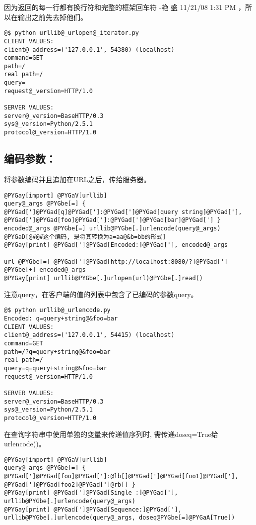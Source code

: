 \documentclass[a4paper,10pt,english]{manual}
\begin{document}
因为返回的每一行都有换行符和完整的框架回车符 -艳 盛 11/21/08 1:31 PM ，所以在输出之前先去掉他们。

\begin{Verbatim}[commandchars=@\[\]]
@$ python urllib@_urlopen@_iterator.py
CLIENT VALUES:
client@_address=('127.0.0.1', 54380) (localhost)
command=GET
path=/
real path=/
query=
request@_version=HTTP/1.0

SERVER VALUES:
server@_version=BaseHTTP/0.3
sys@_version=Python/2.5.1
protocol@_version=HTTP/1.0
\end{Verbatim}


\subsection{编码参数：}

将参数编码并且追加在URL之后，传给服务器。

\begin{Verbatim}[commandchars=@\[\]]
@PYGay[import] @PYGaV[urllib]
query@_args @PYGbe[=] { @PYGad[']@PYGad[q]@PYGad[']:@PYGad[']@PYGad[query string]@PYGad['], @PYGad[']@PYGad[foo]@PYGad[']:@PYGad[']@PYGad[bar]@PYGad['] }
encoded@_args @PYGbe[=] urllib@PYGbe[.]urlencode(query@_args) @PYGaD[@#@#这个编码, 是将其转换为a=aa@&b=bb的形式]
@PYGay[print] @PYGad[']@PYGad[Encoded:]@PYGad['], encoded@_args

url @PYGbe[=] @PYGad[']@PYGad[http://localhost:8080/?]@PYGad['] @PYGbe[+] encoded@_args
@PYGay[print] urllib@PYGbe[.]urlopen(url)@PYGbe[.]read()
\end{Verbatim}

注意query，在客户端的值的列表中包含了已编码的参数query。

\begin{Verbatim}[commandchars=@\[\]]
@$ python urllib@_urlencode.py
Encoded: q=query+string@&foo=bar
CLIENT VALUES:
client@_address=('127.0.0.1', 54415) (localhost)
command=GET
path=/?q=query+string@&foo=bar
real path=/
query=q=query+string@&foo=bar
request@_version=HTTP/1.0

SERVER VALUES:
server@_version=BaseHTTP/0.3
sys@_version=Python/2.5.1
protocol@_version=HTTP/1.0
\end{Verbatim}

在查询字符串中使用单独的变量来传递值序列时, 需传递doseq=True给urlencode()。

\begin{Verbatim}[commandchars=@\[\]]
@PYGay[import] @PYGaV[urllib]
query@_args @PYGbe[=] { @PYGad[']@PYGad[foo]@PYGad[']:@lb[]@PYGad[']@PYGad[foo1]@PYGad['], @PYGad[']@PYGad[foo2]@PYGad[']@rb[] }
@PYGay[print] @PYGad[']@PYGad[Single :]@PYGad['], urllib@PYGbe[.]urlencode(query@_args)
@PYGay[print] @PYGad[']@PYGad[Sequence:]@PYGad['], urllib@PYGbe[.]urlencode(query@_args, doseq@PYGbe[=]@PYGaA[True])
\end{Verbatim}
\end{document}
